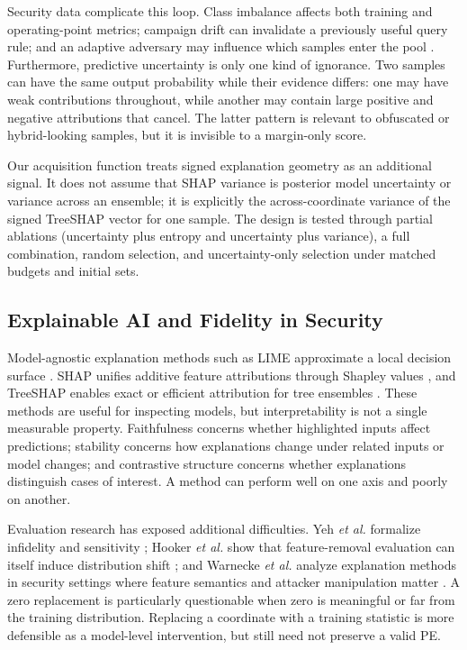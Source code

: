 Security data complicate this loop. Class imbalance affects both training and
operating-point metrics; campaign drift can invalidate a previously useful query
rule; and an adaptive adversary may influence which samples enter the pool
\cite{gama2014concept,arp2022dos}. Furthermore, predictive uncertainty is only one
kind of ignorance. Two samples can have the same output probability while their
evidence differs: one may have weak contributions throughout, while another may
contain large positive and negative attributions that cancel. The latter pattern
is relevant to obfuscated or hybrid-looking samples, but it is invisible to a
margin-only score.

Our acquisition function treats signed explanation geometry as an additional
signal. It does not assume that SHAP variance is posterior model uncertainty or
variance across an ensemble; it is explicitly the across-coordinate variance of
the signed TreeSHAP vector for one sample. The design is tested through partial
ablations (uncertainty plus entropy and uncertainty plus variance), a full
combination, random selection, and uncertainty-only selection under matched
budgets and initial sets.

\subsection{Explainable AI and Fidelity in Security}

Model-agnostic explanation methods such as LIME approximate a local decision
surface \cite{ribeiro2016why}. SHAP unifies additive feature attributions through
Shapley values \cite{lundberg2017unified}, and TreeSHAP enables exact or efficient
attribution for tree ensembles \cite{lundberg2020local}. These methods are useful
for inspecting models, but interpretability is not a single measurable property.
Faithfulness concerns whether highlighted inputs affect predictions; stability
concerns how explanations change under related inputs or model changes; and
contrastive structure concerns whether explanations distinguish cases of
interest. A method can perform well on one axis and poorly on another.

Evaluation research has exposed additional difficulties. Yeh \emph{et al.}
formalize infidelity and sensitivity \cite{yeh2019infidelity}; Hooker \emph{et al.}
show that feature-removal evaluation can itself induce distribution shift
\cite{hooker2019benchmark}; and Warnecke \emph{et al.} analyze explanation methods
in security settings where feature semantics and attacker manipulation matter
\cite{warnecke2020evaluating}. A zero replacement is particularly questionable
when zero is meaningful or far from the training distribution. Replacing a
coordinate with a training statistic is more defensible as a model-level
intervention, but still need not preserve a valid PE.

